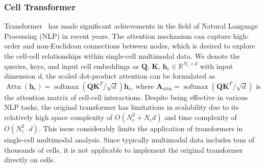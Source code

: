 \subsubsection{Cell Transformer}
Transformer~\cite{vaswani2017attention} has made significant achievements in the field of Natural Language Processing (NLP) in recent years. The attention mechanism can capture high-order and non-Euclidean connections between nodes, which is desired to explore the cell-cell relationships within single-cell multimodal data. We denote the queries, keys, and input cell embeddings as $\mathbf{Q}$, $\mathbf{K}$, $\mathbf{h}_{\text{c}} \in \mathbb{R}^{N_{\text{c}}\times d}$ with input dimension $d$, 
the scaled dot-product attention can be formulated as $\operatorname{Attn}(\mathbf{h}_\text{c})=\operatorname{softmax}\left({\mathbf{Q} \mathbf{K}^{T}}/{\sqrt{d}}\right) \mathbf{h}_\text{c}$,
where $\mathbf{A}_{\text{attn}} = \operatorname{softmax}\left({\mathbf{Q} \mathbf{K}^{T}}/{\sqrt{d}}\right)$ is the attention matrix of cell-cell interactions. Despite being effective in various NLP tasks, the original transformer has limitations in scalability due to its relatively high space complexity of $O(N_\text{c}^2 + N_\text{c} d)$ and time complexity of $O(N_\text{c}^2·d)$. This issue considerably limits the application of transformers in single-cell multimodal analysis. Since typically multimodal data includes tens of thousands of cells, it is not applicable to implement the original transformer directly on cells. 

